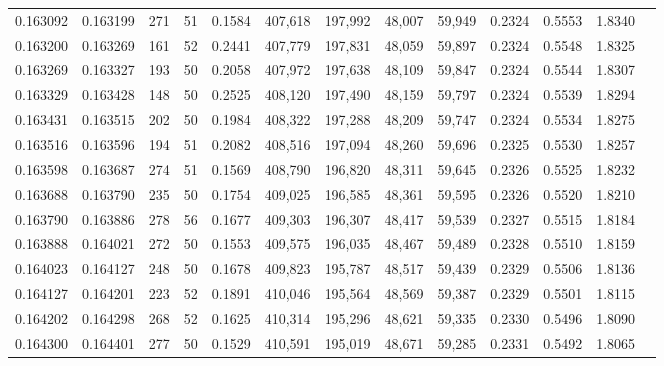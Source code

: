 \begin{tabular}{rrrrrrrrrrrrr}
0.163092 & 0.163199 &   271 &  51 &                                     0.1584 & 407,618 & 197,992 &  48,007 &  59,949 & 0.2324 & 0.5553 & 1.8340 \\
0.163200 & 0.163269 &   161 &  52 &                                     0.2441 & 407,779 & 197,831 &  48,059 &  59,897 & 0.2324 & 0.5548 & 1.8325 \\
0.163269 & 0.163327 &   193 &  50 &                                     0.2058 & 407,972 & 197,638 &  48,109 &  59,847 & 0.2324 & 0.5544 & 1.8307 \\
0.163329 & 0.163428 &   148 &  50 &                                     0.2525 & 408,120 & 197,490 &  48,159 &  59,797 & 0.2324 & 0.5539 & 1.8294 \\
0.163431 & 0.163515 &   202 &  50 &                                     0.1984 & 408,322 & 197,288 &  48,209 &  59,747 & 0.2324 & 0.5534 & 1.8275 \\
0.163516 & 0.163596 &   194 &  51 &                                     0.2082 & 408,516 & 197,094 &  48,260 &  59,696 & 0.2325 & 0.5530 & 1.8257 \\
0.163598 & 0.163687 &   274 &  51 &                                     0.1569 & 408,790 & 196,820 &  48,311 &  59,645 & 0.2326 & 0.5525 & 1.8232 \\
0.163688 & 0.163790 &   235 &  50 &                                     0.1754 & 409,025 & 196,585 &  48,361 &  59,595 & 0.2326 & 0.5520 & 1.8210 \\
0.163790 & 0.163886 &   278 &  56 &                                     0.1677 & 409,303 & 196,307 &  48,417 &  59,539 & 0.2327 & 0.5515 & 1.8184 \\
0.163888 & 0.164021 &   272 &  50 &                                     0.1553 & 409,575 & 196,035 &  48,467 &  59,489 & 0.2328 & 0.5510 & 1.8159 \\
0.164023 & 0.164127 &   248 &  50 &                                     0.1678 & 409,823 & 195,787 &  48,517 &  59,439 & 0.2329 & 0.5506 & 1.8136 \\
0.164127 & 0.164201 &   223 &  52 &                                     0.1891 & 410,046 & 195,564 &  48,569 &  59,387 & 0.2329 & 0.5501 & 1.8115 \\
0.164202 & 0.164298 &   268 &  52 &                                     0.1625 & 410,314 & 195,296 &  48,621 &  59,335 & 0.2330 & 0.5496 & 1.8090 \\
0.164300 & 0.164401 &   277 &  50 &                                     0.1529 & 410,591 & 195,019 &  48,671 &  59,285 & 0.2331 & 0.5492 & 1.8065 \\

\end{tabular}
